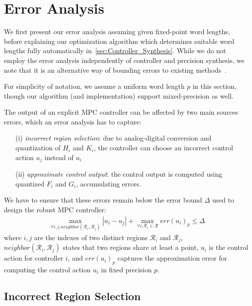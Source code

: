 \section{Error Analysis}
\label{sec:Error_Analysis}

We first present our error analysis assuming given fixed-point word lengths,
before explaining our optimization algorithm which determines suitable word
lengths fully automatically in~\autoref{sec:Controller_Synthesis}.
While we do not employ the error analysis independently of controller and
precision synthesis, we note that it is an alternative way of bounding errors to
existing methods~\cite{imperialrmpc}.

For simplicity of notation, we assume a uniform word length $p$ in this section,
though our algorithm (and implementation) support mixed-precision as well.

The output of an explicit MPC controller can be affected by two main sources
errors, which an error analysis has to capture\cite{imperialrmpc}:
\begin{itemize}
  \item[(i)] \emph{incorrect region selection}: 
    due to analog-digital conversion and quantization of $H_i$ and $K_i$,
    the controller can choose an incorrect control action $u_j$ instead of $u_i$
    
  \item[(ii)] \emph{approximate control output}: the control output is computed
    using quantized $F_i$ and $G_i$, accumulating errors.
\end{itemize}

We have to ensure that these errors remain below the error bound $\Delta$
used to design the robust MPC controller:
\begin{align}\label{eq:delta}
  \max_{\forall i,j. \mathit{neighbor}(\mathcal{R}_{i},\mathcal{R}_{j})}|u_{i}-u_{j}| + \max_{\forall i.\mathcal{R}_{i}\in\mathcal{R}} err(u_{i})_{p} \le \Delta
\end{align}
where $i,j$ are the indexes of two distinct regions $\mathcal{R}_{i}$ and
$\mathcal{R}_{j}$, \\ $\mathit{neighbor}(\mathcal{R}_{i},\mathcal{R}_{j})$
states that two regions share at least a point, $u_{i}$ is the control action
for controller $i$, and $err(u_{i})_{p}$ captures the approximation error for
computing the control action $u_{i}$ in fixed precision $p$.

\subsection{Incorrect Region Selection}

